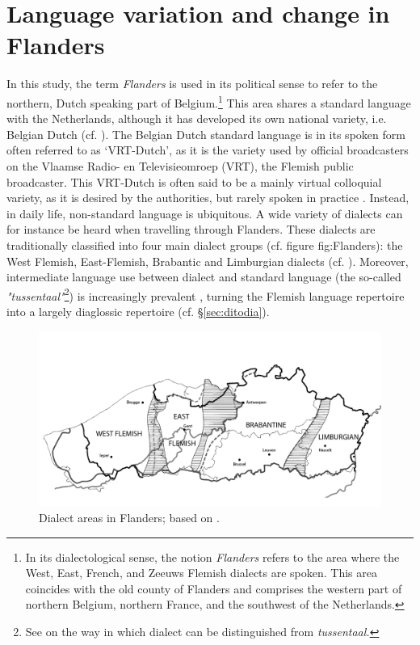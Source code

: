 \documentclass[output=paper]{LSP/langsci}
\begin{document}
\section{Language variation and change in Flanders}
\label{sec:Flanders}

In this study, the term \textit{Flanders} is used in its political sense to refer to the northern, Dutch speaking part of Belgium.\footnote{In its dialectological sense, the notion \textit{Flanders} refers to the area where the West, East, French, and Zeeuws Flemish dialects are spoken. This area coincides with the old county of Flanders and comprises the western part of northern Belgium, northern France, and the southwest of the Netherlands.} This area shares a standard language with the Netherlands, although it has developed its own national variety, i.e. Belgian Dutch (cf. \citealt{grondelaers_standard_2011}). The Belgian Dutch standard language is in its spoken form often referred to as ‘VRT-Dutch’, as it is the variety used by official broadcasters on the Vlaamse Radio- en Televisieomroep (VRT), the Flemish public broadcaster. This VRT-Dutch is often said to be a mainly virtual colloquial variety, as it is desired by the authorities, but rarely spoken in practice \citep[19]{de_caluwe_tussentaal_2009}. Instead, in daily life, non-standard language is ubiquitous. A wide variety of dialects can for instance be heard when travelling through Flanders. These dialects are traditionally classified into four main dialect groups (cf. figure {fig:Flanders}): the West Flemish, East-Flemish, Brabantic and Limburgian dialects (cf. \citealt{vandekerckhove_dialect_2009}). Moreover, intermediate language use between dialect and standard language (the so-called \textit{"tussentaal"}\footnote{See \citet{ghyselen_stabilisering_forthcoming} on the way in which dialect can be distinguished from \textit{tussentaal.}}) is increasingly prevalent \citep{de_caluwe_tussentaal_2006}, turning the Flemish language repertoire into a largely diaglossic repertoire (cf. §\ref{sec:ditodia}).

\begin{figure}
\includegraphics[width=\textwidth]{illustrations/ghys_fig1.png}
\caption{Dialect areas in Flanders; based on \citet[359]{taeldeman_linguistic_2009}.}
\label{fig:Flanders}
\end{figure}
\end{document}
